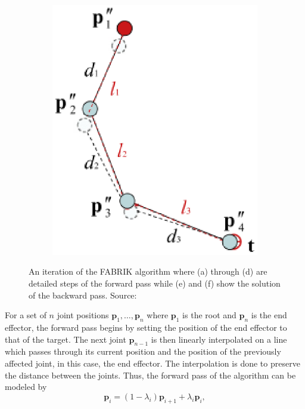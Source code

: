 \begin{figure}
\begin{subfigure}{0.2\textwidth}
        \includegraphics[width=\linewidth]{grafika/fabrik_iteration6.eps}
        \subcaption{}
        \label{fig:fabrik6}
    \end{subfigure}
    \caption{An iteration of the FABRIK algorithm where (a) through (d) are
    detailed steps of the forward pass while (e) and (f) show the solution of
    the backward pass. Source: \cite{Aristidou2011}}
    \label{fig:fabrik}
\end{figure}


For a set of \(n\) joint positions \(\mathbf{p}_1, \dots, \mathbf{p}_n\) where
\(\mathbf{p}_1\) is the root and \(\mathbf{p}_n\) is the end effector, the forward pass
begins by setting the position of the end effector to that of the target. The
next joint \(\mathbf{p}_{n-1}\) is then linearly interpolated on a line which
passes through its current position and the position of the previously affected
joint, in this case, the end effector. The interpolation is done to preserve the
distance between the joints. Thus, the forward pass of the algorithm can be
modeled by 
\begin{equation}
    \mathbf{p}_i = (1 - \lambda_i)\mathbf{p}_{i+1} + \lambda_i \mathbf{p}_i,
\end{equation}

